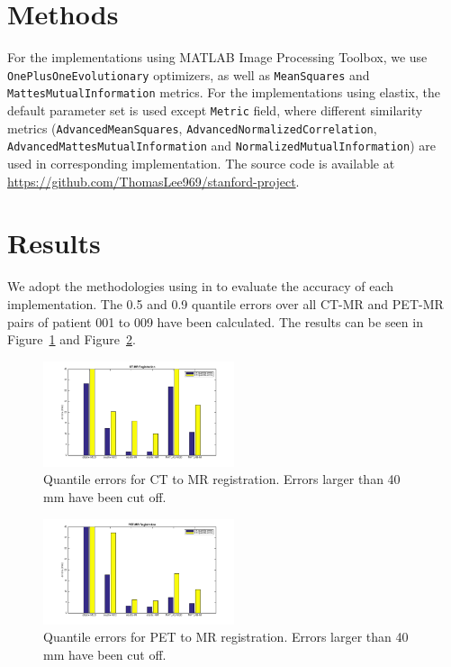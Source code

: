 \documentclass{IEEEtran}
\begin{document}
  \section{Methods}

  For the implementations using MATLAB Image Processing Toolbox, we use \texttt{OnePlusOneEvolutionary} optimizers, as well as \texttt{MeanSquares} and \texttt{MattesMutualInformation} metrics. For the implementations using elastix, the default parameter set is used except \texttt{Metric} field, where different similarity metrics (\texttt{AdvancedMeanSquares}, \texttt{AdvancedNormalizedCorrelation}, \texttt{AdvancedMattesMutualInformation} and \texttt{NormalizedMutualInformation}) are used in corresponding implementation. The source code is available at \url{https://github.com/ThomasLee969/stanford-project}.

  \section{Results}

  We adopt the methodologies using in \cite{pluim2004f} to evaluate the accuracy of each implementation. The 0.5 and 0.9 quantile errors over all CT-MR and PET-MR pairs of patient 001 to 009 have been calculated. The results can be seen in Figure~\ref{fig:CT-MR_bars} and Figure~\ref{fig:PET-MR_bars}.

  \begin{figure}[htbp]
    \centering
    \includegraphics[width=0.5\textwidth]{CT-MR_bars.png}
    \caption{Quantile errors for CT to MR registration. Errors larger than 40 mm have been cut off.}
    \label{fig:CT-MR_bars}
  \end{figure}

  \begin{figure}[htbp]
    \centering
    \includegraphics[width=0.5\textwidth]{PET-MR_bars.png}
    \caption{Quantile errors for PET to MR registration. Errors larger than 40 mm have been cut off.}
    \label{fig:PET-MR_bars}
  \end{figure}
\end{document}

